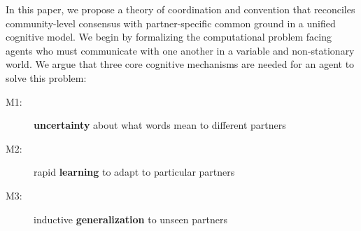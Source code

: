 In this paper, we propose a theory of coordination and convention that reconciles community-level consensus with partner-specific common ground in a unified cognitive model.
We begin by formalizing the computational problem facing agents who must communicate with one another in a variable and non-stationary world. 
We argue that three core cognitive mechanisms are needed for an agent to solve this problem: 
\begin{description}
\item[M1:] \textbf{uncertainty} about what words mean to different partners
\item[M2:] rapid \textbf{learning} to adapt to particular partners
\item[M3:] inductive \textbf{generalization} to unseen partners
\end{description}
